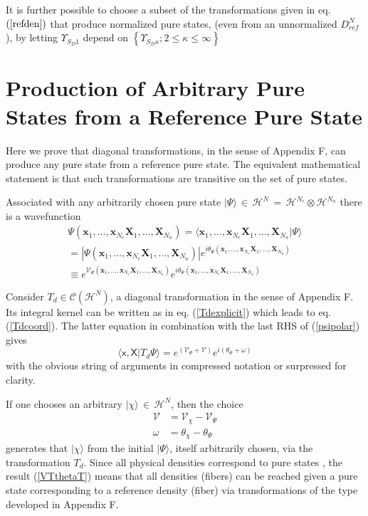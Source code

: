 \documentclass[aps,preprint]{revtex4}%
\begin{document}
It is further possible to choose a subset of the transformations given in eq.
$\left(  \ref{refden}\right)  $ that produce normalized pure states, (even
from an unnormalized $D_{ref}^{N}$), by letting $\Upsilon_{S_{D}1}$ depend on
$\left\{  \Upsilon_{S_{D}\kappa};2\leq\kappa\leq\infty\right\}  $

\section{Production of Arbitrary Pure States from a Reference Pure State}

\noindent Here we prove that diagonal transformations, in the sense of
Appendix F, can produce any pure state from a reference pure state. The
equivalent mathematical statement is that such transformations are transitive
on the set of pure states.

Associated with any arbitrarily chosen pure state $|\Psi\rangle\,\in
\,\mathcal{H}^{N}\,=\,\mathcal{H}^{N_{e}}\otimes\mathcal{H}^{N_{n}}$ there is
a wavefunction
\begin{gather}
\Psi(\mathbf{x}_{1},\ldots,\mathbf{x}_{N_{e}}\mathbf{X}_{1},\ldots
,\mathbf{X}_{N_{n}})=\langle\mathbf{x}_{1},\ldots,\mathbf{x}_{N_{e}}%
\mathbf{X}_{1},\ldots,\mathbf{X}_{N_{n}}|\Psi\rangle\nonumber\\
=|\Psi(\mathbf{x}_{1},\ldots,\mathbf{x}_{N_{e}}\mathbf{X}_{1},\ldots
,\mathbf{X}_{N_{n}})|e^{i\theta_{\Psi}(\mathbf{x}_{1},\ldots,\mathbf{x}%
_{N_{e}}\mathbf{X}_{1},\ldots,\mathbf{X}_{N_{n}})}\nonumber\\
\equiv e^{\mathcal{V}_{\Psi}(\mathbf{x}_{1},\ldots,\mathbf{x}_{N_{e}%
}\mathbf{X}_{1},\ldots,\mathbf{X}_{N_{n}})}e^{i\theta_{\Psi}(\mathbf{x}%
_{1},\ldots,\mathbf{x}_{N_{e}}\mathbf{X}_{1},\ldots,\mathbf{X}_{N_{n}})}
\label{psipolar}%
\end{gather}


Consider $T_{d}\in\mathcal{C}(\mathcal{H}^{N})$, a diagonal transformation in
the sense of Appendix F. Its integral kernel can be written as in eq.
(\ref{Tdexplicit}) which leads to eq. (\ref{Tdcoord}). The latter equation in
combination with the last RHS of (\ref{psipolar}) gives
\begin{equation}
\langle\mathsf{x},\mathsf{X}|T_{d}\Psi\rangle=e^{(\mathcal{V}_{\Psi}+
\mathcal{V})}e^{i(\theta_{\Psi}+\omega)}%
\end{equation}
with the obvious string of arguments in compressed notation or surpressed for clarity.

If one chooses an arbitrary $|\chi\rangle\,\in\,\mathcal{H}^{N}$, then the
choice
\begin{align}
\mathcal{V}  &  =\mathcal{V}_{\chi}-\mathcal{V}_{\Psi}\nonumber\\
\omega &  =\theta_{\chi}-\theta_{\Psi} \label{VTthetaT}%
\end{align}
generates that $|\chi\rangle$ from the initial $|\Psi\rangle$, itself
arbitrarily chosen, via the transformation $T_{d}$. Since all physical
densities correspond to pure states \cite{Harriman81}, the result
(\ref{VTthetaT}) means that all densities (fibers) can be reached given a pure
state corresponding to a reference density (fiber) via transformations of the
type developed in Appendix F.
\end{document}

